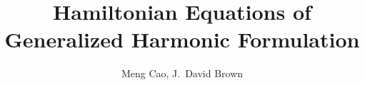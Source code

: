 \documentclass[letterpaper,nofootinbib,prd,amsmath,onecolumn]{revtex4-1}
\begin{document}

\title{Hamiltonian Equations of Generalized Harmonic Formulation}
\author{Meng Cao, J.~David Brown}

\begin{abstract}

\end{abstract}
\maketitle
\end{document}
